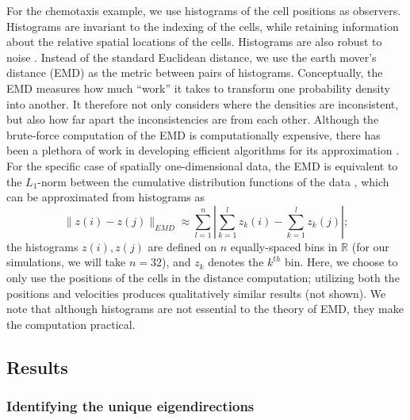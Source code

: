 \documentclass[3p]{elsarticle}
\begin{document}
For the chemotaxis example, we use histograms of the cell positions as observers.
%
Histograms are invariant to the indexing of the cells, while retaining information about the relative spatial locations of the cells.
%
Histograms are also robust to noise \cite{talmon2013empirical}.
%
Instead of the standard Euclidean distance, we use the earth mover's distance (EMD) \cite{rubner2000earth} as the metric between pairs of histograms.
%
Conceptually, the EMD measures how much ``work'' it takes to transform one probability density into another.
%
It therefore not only considers where the densities are inconsistent, but also how far apart the inconsistencies are from each other.
%
Although the brute-force computation of the EMD is computationally expensive, 
there has been a plethora of work in developing efficient algorithms for its approximation \cite{Pele-eccv2008, Pele-iccv2009, leeb2014lipschitz}.
%
For the specific case of spatially one-dimensional data, the EMD is equivalent to the $L_1$-norm between the 
cumulative distribution functions of the data \cite{rubner2000perceptual}, which can be approximated from histograms as
\begin{equation}
\| z(i) - z(j) \|_{EMD} \approx \sum_{l=1}^{n} \left| \sum_{k=1}^l z_k(i) - \sum_{k=1}^l z_k(j) \right|;
\end{equation}
the histograms $z(i), z(j)$ are defined on $n$ equally-spaced bins in $\mathbb{R}$ (for our simulations, we will take $n=32$), and $z_k$ denotes the $k^{th}$ bin.
%
Here, we choose to only use the positions of the cells in the distance computation; utilizing both the positions and velocities produces qualitatively similar results (not shown).
%
We note that although histograms are not essential to the theory of EMD, they make the computation practical.


\subsection{Results}

\subsubsection{Identifying the unique eigendirections}
\end{document}
